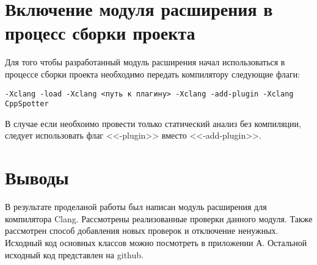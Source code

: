 \section{Включение модуля расширения в процесс сборки проекта}
Для того чтобы разработанный модуль расширения начал использоваться в процессе сборки проекта необходимо 
передать компилятору следующие флаги:
\begin{lstlisting}
-Xclang -load -Xclang <путь к плагину> -Xclang -add-plugin -Xclang CppSpotter  
\end{lstlisting}

В случае если необхоимо провести только статический анализ без компиляции, следует использовать
флаг <<-plugin>> вместо <<-add-plugin>>.

\section{Выводы}
В результате проделаной работы был написан модуль расширения для компилятора Clang. Рассмотрены 
реализованные проверки данного модуля. Также рассмотрен способ добавления новых проверок и отключение ненужных.
Исходный код основных классов можно посмотреть в приложении А. Остальной исходный код представлен на github\cite{git}.

